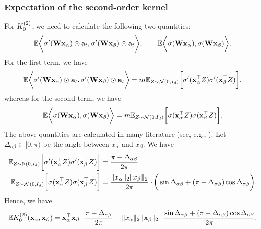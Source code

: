 \subsubsection{Expectation of the second-order kernel}
\label{subsubsection:label-agnostic-kernel}
For ${K}^{(2)}_0$, we need to calculate the following two quantities:
\[
	{\mathbb{E}} \bigg\langle \sigma'({\mathbf{W}} {\mathbf{x}}_\alpha)\odot{\mathbf{a}}_t, \sigma'({\mathbf{W}} {\mathbf{x}}_\beta)\odot{\mathbf{a}}_t  \bigg\rangle,  \qquad {\mathbb{E}} \bigg\langle \sigma({\mathbf{W}} {\mathbf{x}}_\alpha), \sigma({\mathbf{W}} {\mathbf{x}}_\beta) \bigg\rangle.
\]
For the first term, we have 
\[
	{\mathbb{E}} \bigg\langle \sigma'({\mathbf{W}} {\mathbf{x}}_\alpha)\odot{\mathbf{a}}_t, \sigma'({\mathbf{W}} {\mathbf{x}}_\beta)\odot{\mathbf{a}}_t  \bigg\rangle = m {\mathbb{E}}_{Z\sim{\mathcal{N}}(0, I_d)} \bigg[\sigma'({\mathbf{x}}_\alpha^\top Z)\sigma'({\mathbf{x}}_\beta^\top Z) \bigg],
\]
whereas for the second term, we have
\[
	{\mathbb{E}} \bigg\langle \sigma({\mathbf{W}} {\mathbf{x}}_\alpha), \sigma({\mathbf{W}} {\mathbf{x}}_\beta) \bigg\rangle = m {\mathbb{E}}_{Z\sim{\mathcal{N}}(0, I_d)} \bigg[\sigma({\mathbf{x}}_\alpha^\top Z)\sigma({\mathbf{x}}_\beta^\top Z)\bigg].
\]
The above quantities are calculated in many literature (see, e.g., \citealt{cho2010large,arora2019exact,bietti2019inductive}). Let $\Delta_{\alpha\beta}\in[0, \pi)$ be the angle between $x_\alpha$ and $x_\beta$. We have
\begin{align*}
	{\mathbb{E}}_{Z\sim{\mathbb{N}}(0, I_d)} \bigg[\sigma'({\mathbf{x}}_\alpha^\top Z)\sigma'({\mathbf{x}}_\beta^\top Z) \bigg] & = \frac{\pi - \Delta_{\alpha\beta}}{2\pi}\\
	{\mathbb{E}}_{Z\sim{\mathcal{N}}(0, I_d)} \bigg[\sigma({\mathbf{x}}_\alpha^\top Z)\sigma({\mathbf{x}}_\beta^\top Z)\bigg] & = \frac{\|x_\alpha\|_2\|x_\beta\|_2 }{2\pi} \cdot \bigg(\sin\Delta_{\alpha\beta} + (\pi-\Delta_{\alpha\beta})\cos\Delta_{\alpha\beta}\bigg).
\end{align*}	
Hence, we have
\begin{equation*}
	\label{eq: K_2_two_layer_expectation}
	{\mathbb{E}} {K}^{(2)}_0({\mathbf{x}}_\alpha,{\mathbf{x}}_\beta) ={\mathbf{x}}_\alpha^\top{\mathbf{x}}_\beta \cdot \frac{\pi - \Delta_{\alpha\beta}}{2\pi} +  \|x_\alpha \|_2 \|{\mathbf{x}}_\beta\|_2 \cdot \frac{\sin\Delta_{\alpha\beta} + (\pi - \Delta_{\alpha\beta})\cos\Delta_{\alpha\beta}}{2\pi}.
\end{equation*}

